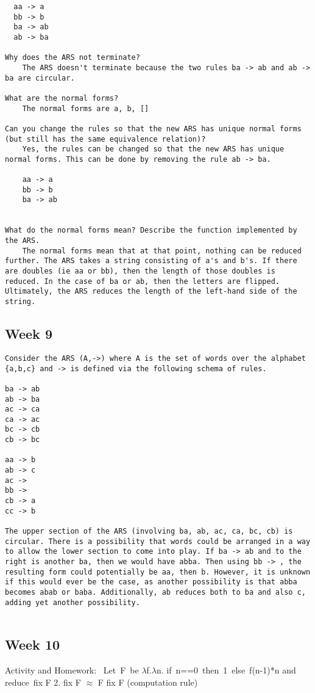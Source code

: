 \documentclass{article}
\theoremstyle{theorem}
\theoremstyle{definition}
\theoremstyle{remark}
\begin{document}
\begin{lstlisting}
  aa -> a
  bb -> b
  ba -> ab
  ab -> ba

Why does the ARS not terminate?
    The ARS doesn't terminate because the two rules ba -> ab and ab -> ba are circular.

What are the normal forms?
    The normal forms are a, b, []

Can you change the rules so that the new ARS has unique normal forms (but still has the same equivalence relation)?
    Yes, the rules can be changed so that the new ARS has unique normal forms. This can be done by removing the rule ab -> ba.
    
    aa -> a
    bb -> b
    ba -> ab
    

What do the normal forms mean? Describe the function implemented by the ARS.
    The normal forms mean that at that point, nothing can be reduced further. The ARS takes a string consisting of a's and b's. If there are doubles (ie aa or bb), then the length of those doubles is reduced. In the case of ba or ab, then the letters are flipped. Ultimately, the ARS reduces the length of the left-hand side of the string.

\end{lstlisting}
%

\subsection{Week 9}
\begin{lstlisting}
Consider the ARS (A,->) where A is the set of words over the alphabet {a,b,c} and -> is defined via the following schema of rules.

ba -> ab
ab -> ba
ac -> ca
ca -> ac
bc -> cb
cb -> bc
 
aa -> b
ab -> c
ac ->  
bb -> 
cb -> a
cc -> b

The upper section of the ARS (involving ba, ab, ac, ca, bc, cb) is circular. There is a possibility that words could be arranged in a way to allow the lower section to come into play. If ba -> ab and to the right is another ba, then we would have abba. Then using bb -> , the resulting form could potentially be aa, then b. However, it is unknown if this would ever be the case, as another possibility is that abba becomes abab or baba. Additionally, ab reduces both to ba and also c, adding yet another possibility. 


\end{lstlisting}

\subsection{Week 10}
Activity and Homework: 
\newline\indent
Let F be $\lambda$f.$\lambda$n. if n==0 then 1 else f(n-1)*n and reduce fix F 2.
\newline\indent
fix F $\approx$ F fix F (computation rule)
\end{document}
